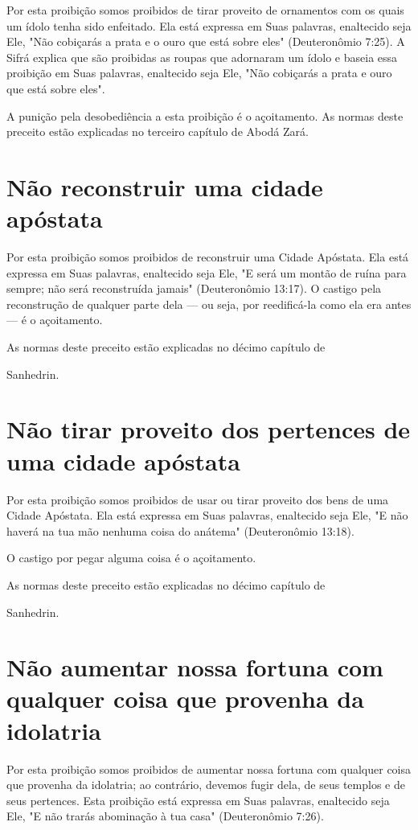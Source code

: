 \begin{itemize}
\begin{enumrate}
\begin{itemize}
\begin{itemize}
\begin{itemize}
Por esta proibição somos proibidos de tirar proveito de ornamentos com
os quais um ídolo tenha sido enfeitado. Ela está expressa em Suas
pala­vras, enaltecido seja Ele, "Não cobiçarás a prata e o ouro que está
sobre eles" (Deuteronômio 7:25). A Sifrá explica que são proibidas as
roupas que adorna­ram um ídolo e baseia essa proibição em Suas palavras,
enaltecido seja Ele, "Não cobiçarás a prata e ouro que está sobre eles".

A punição pela desobediência a esta proibição é o açoitamento. As normas
deste preceito estão explicadas no terceiro capítulo de Abodá Zará.

\section{Não reconstruir uma cidade apóstata}

Por esta proibição somos proibidos de reconstruir uma Cidade Após­tata.
Ela está expressa em Suas palavras, enaltecido seja Ele, "E será um
montão de ruína para sempre; não será reconstruída jamais" (Deuteronômio
13:17). O castigo pela reconstrução de qualquer parte dela --- ou seja,
por reedificá-la co­mo ela era antes --- é o açoitamento.


As normas deste preceito estão explicadas no décimo capítulo de


Sanhedrin.

\section{Não tirar proveito dos pertences de uma cidade apóstata}

Por esta proibição somos proibidos de usar ou tirar proveito dos bens de
uma Cidade Apóstata. Ela está expressa em Suas palavras, enaltecido seja
Ele, "E não haverá na tua mão nenhuma coisa do anátema" (Deuteronômio
13:18).

O castigo por pegar alguma coisa é o açoitamento.


As normas deste preceito estão explicadas no décimo capítulo de


Sanhedrin.

\section{Não aumentar nossa fortuna com qualquer coisa que provenha da idolatria}

Por esta proibição somos proibidos de aumentar nossa fortuna com
qualquer coisa que provenha da idolatria; ao contrário, devemos fugir
dela, de seus templos e de seus pertences. Esta proibição está expressa
em Suas palavras, enaltecido seja Ele, "E não trarás abominação à tua casa"
(Deuteronômio 7:26).



\end{itemize}
\end{itemize}
\end{itemize}
\end{enumrate}
\end{itemize}
